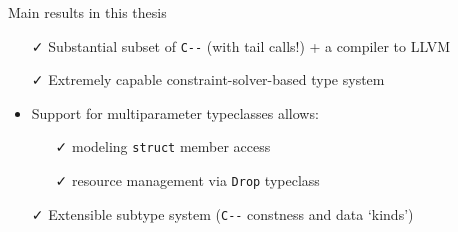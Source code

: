\documentclass[aspectratio=169]{beamer}
\def\cmm{\texttt{C-\relax-}}
\begin{document}

\begin{frame}{Main results in this thesis}
  \begin{itemize}
  \item[\color{green!80!black}\faCheck] Substantial subset of \cmm{} (with tail calls!) + a compiler to LLVM
  \item[\color{green!80!black}\faCheck] Extremely capable constraint-solver-based type system
  \item Support for multiparameter typeclasses allows:
    \begin{itemize}
      \item[\color{green!80!black}\faCheck] modeling \texttt{struct} member access
      \item[\color{green!80!black}\faCheck] resource management via \texttt{Drop} typeclass
    \end{itemize}
  \item[\color{green!80!black}\faCheck] Extensible subtype system (\cmm{} constness and data `kinds')
  \end{itemize}
\end{frame}


%
%
\end{document}
